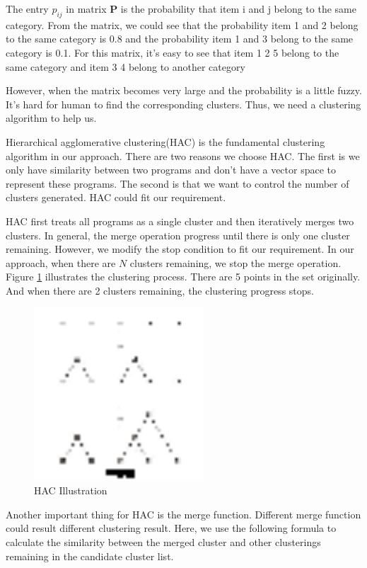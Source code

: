 The entry $p_{ij}$ in matrix $\boldsymbol{P}$ is the probability that item i and j belong to the same category. From the matrix, we could see that the probability
item 1 and 2 belong to the same category is 0.8 and the probability item 1 and 3 belong to the same category is 0.1. For this matrix, it's easy to see that item
1 2 5 belong to the same category and item 3 4 belong to another category

However, when the matrix becomes very large and the probability is a little fuzzy. It's hard for human to find the corresponding clusters. Thus, we need a clustering
algorithm to help us.

Hierarchical agglomerative clustering(HAC)\cite{DBLP:conf/icpr/Gil-GarciaBP06} is the fundamental clustering algorithm in our approach. There are two reasons we choose HAC. The first is we only have
similarity between two programs and don't have a vector space to represent these programs. The second is that we want to control the number of clusters generated.
HAC could fit our requirement.

HAC first treats all programs as a single cluster and then iteratively merges two clusters. In general, the merge operation progress until there is only one cluster
remaining. However, we modify the stop condition to fit our requirement. In our approach, when there are $N$ clusters remaining, we stop the merge operation. Figure
\ref{fig:3} illustrates the clustering process. There are 5 points in the set originally. And when there are 2 clusters remaining, the clustering progress stops.

\begin{figure}[htbp]
\centering
\includegraphics[width=2.5in]{clustering.eps}
\caption{HAC Illustration}
\label{fig:3}
\end{figure}

Another important thing for HAC is the merge function\cite{Zadeh:2009:UTC:1795114.1795189}\cite{Carlsson:2010:CSC:1859890.1859898}\cite{5231070}.
Different merge function could result different clustering result. Here, we use the following formula to calculate
the similarity between the merged cluster and other clusterings remaining in the candidate cluster list.


